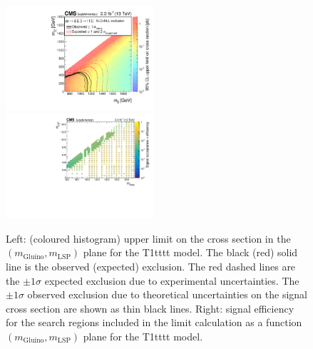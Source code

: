 \begin{figure}[t]
  \begin{center}
    \includegraphics[width=0.49\textwidth]{supplementary/figures/RA1T1ttttXSEC} \, 
    \includegraphics[width=0.49\textwidth]{supplementary/figures/T1tttt_merging_4_cats} \,     
  \end{center}
  \caption{Left: (coloured histogram) upper limit on the cross section in the $(m_{\mathrm{Gluino}},m_{\mathrm{LSP}})$ plane for the T1tttt model. 
  The black (red) solid line is the observed (expected) exclusion. The red dashed lines are the $\pm1\sigma$ expected exclusion due to experimental uncertainties. 
  The $\pm1\sigma$ observed exclusion due to theoretical uncertainties on the signal cross section are shown as thin black lines. 
  Right: signal efficiency for the search regions included in the limit calculation as a function $(m_{\mathrm{Gluino}},m_{\mathrm{LSP}})$ plane for the T1tttt model. 
  \label{fig:T1tttt_excl}}
\end{figure}

